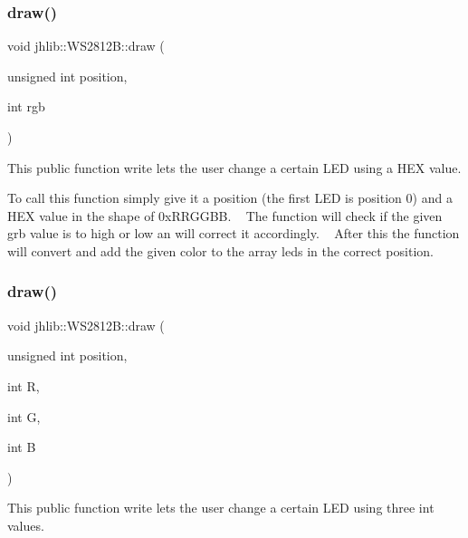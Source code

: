 \subsubsection{\texorpdfstring{draw()}{draw()}\hspace{0.1cm}{\footnotesize\ttfamily [1/2]}}
{\footnotesize\ttfamily void jhlib\+::\+W\+S2812\+B\+::draw (\begin{DoxyParamCaption}\item[{unsigned int}]{position,  }\item[{int}]{rgb }\end{DoxyParamCaption})\hspace{0.3cm}{\ttfamily [inline]}}



This public function write lets the user change a certain L\+ED using a H\+EX value. 

To call this function simply give it a position (the first L\+ED is position 0) and a H\+EX value in the shape of 0x\+R\+R\+G\+G\+BB. ~\newline
 The function will check if the given grb value is to high or low an will correct it accordingly. ~\newline
 After this the function will convert and add the given color to the array leds in the correct position. \mbox{\label{classjhlib_1_1WS2812B_acc0da0a0477c66d665ae9a8cf78c0a8d}} 
\subsubsection{\texorpdfstring{draw()}{draw()}\hspace{0.1cm}{\footnotesize\ttfamily [2/2]}}
{\footnotesize\ttfamily void jhlib\+::\+W\+S2812\+B\+::draw (\begin{DoxyParamCaption}\item[{unsigned int}]{position,  }\item[{int}]{R,  }\item[{int}]{G,  }\item[{int}]{B }\end{DoxyParamCaption})\hspace{0.3cm}{\ttfamily [inline]}}



This public function write lets the user change a certain L\+ED using three int values. 

